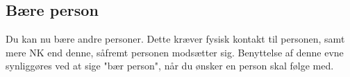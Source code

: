 \subsection{Bære person}
Du kan nu bære andre personer. Dette kræver fysisk kontakt til personen, samt mere NK end denne, såfremt personen modsætter sig. Benyttelse af denne evne synliggøres ved at sige "bær person", når du ønsker en person skal følge med.\\